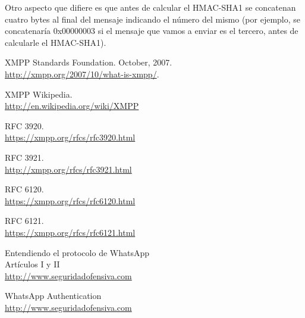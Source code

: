 \documentclass[a4paper, 11pt]{article} %
\begin{document}
Otro aspecto que difiere es que antes de calcular el HMAC-SHA1 se concatenan cuatro bytes al final del mensaje indicando
el número del mismo (por ejemplo, se concatenaría 0x00000003 si  el mensaje que vamos a enviar es el tercero, antes
de calcularle el HMAC-SHA1).

\vfill
\begin{thebibliography}{9}

  XMPP Standards Foundation. October, 2007.\\
  \url{http://xmpp.org/2007/10/what-is-xmpp/}.
  
  XMPP Wikipedia.\\
  \url{http://en.wikipedia.org/wiki/XMPP}
  
  RFC 3920.\\
  \url{https://xmpp.org/rfcs/rfc3920.html}
  
  RFC 3921.\\
  \url{http://xmpp.org/rfcs/rfc3921.html}

  RFC 6120.\\
  \url{https://xmpp.org/rfcs/rfc6120.html}
  
  RFC 6121.\\
  \url{https://xmpp.org/rfcs/rfc6121.html}
  
  Entendiendo el protocolo de WhatsApp\\
  Artículos I y II\\
  \url{http://www.seguridadofensiva.com}

  WhatsApp Authentication\\
  \url{http://www.seguridadofensiva.com}

\end{thebibliography} 
  
\end{document}
